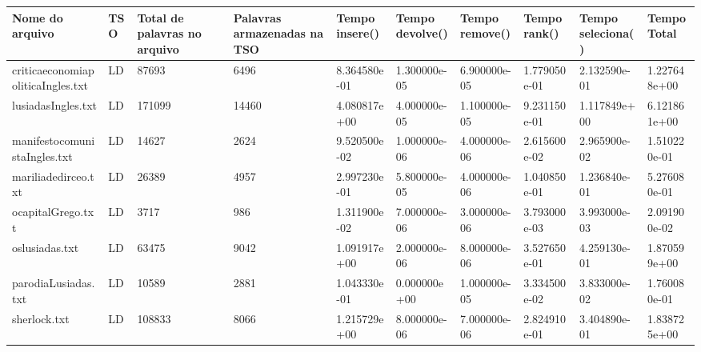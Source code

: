 \begin{tabular}{|l|l|l|l|l|l|l|l|l|l|}
\hline
Nome do arquivo&TSO&Total de palavras no arquivo&Palavras armazenadas na TSO&Tempo insere()&Tempo devolve()&Tempo remove()&Tempo rank()&Tempo seleciona()&Tempo Total\\
\hline
criticaeconomiapoliticaIngles.txt&LD&87693&6496&8.364580e-01&1.300000e-05&6.900000e-05&1.779050e-01&2.132590e-01&1.227648e+00\\
\hline
lusiadasIngles.txt&LD&171099&14460&4.080817e+00&4.000000e-05&1.100000e-05&9.231150e-01&1.117849e+00&6.121861e+00\\
\hline
manifestocomunistaIngles.txt&LD&14627&2624&9.520500e-02&1.000000e-06&4.000000e-06&2.615600e-02&2.965900e-02&1.510220e-01\\
\hline
mariliadedirceo.txt&LD&26389&4957&2.997230e-01&5.800000e-05&4.000000e-06&1.040850e-01&1.236840e-01&5.276080e-01\\
\hline
ocapitalGrego.txt&LD&3717&986&1.311900e-02&7.000000e-06&3.000000e-06&3.793000e-03&3.993000e-03&2.091900e-02\\
\hline
oslusiadas.txt&LD&63475&9042&1.091917e+00&2.000000e-06&8.000000e-06&3.527650e-01&4.259130e-01&1.870599e+00\\
\hline
parodiaLusiadas.txt&LD&10589&2881&1.043330e-01&0.000000e+00&1.000000e-05&3.334500e-02&3.833000e-02&1.760080e-01\\
\hline
sherlock.txt&LD&108833&8066&1.215729e+00&8.000000e-06&7.000000e-06&2.824910e-01&3.404890e-01&1.838725e+00\\
\hline
\end{tabular}